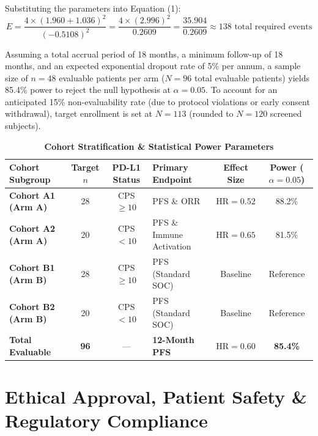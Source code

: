 \documentclass[10pt,a4paper]{article}
\begin{document}
Substituting the parameters into Equation (1):
\begin{equation}
  E = \frac{4 \times (1.960 + 1.036)^2}{(-0.5108)^2} = \frac{4 \times (2.996)^2}{0.2609} = \frac{35.904}{0.2609} \approx 138 \text{ total required events}
\end{equation}

Assuming a total accrual period of 18 months, a minimum follow-up of 18 months, and an expected exponential dropout rate of 5\% per annum, a sample size of $n = 48$ evaluable patients per arm ($N = 96$ total evaluable patients) yields 85.4\% power to reject the null hypothesis at $\alpha = 0.05$. To account for an anticipated 15\% non-evaluability rate (due to protocol violations or early consent withdrawal), target enrollment is set at $N = 113$ (rounded to $N = 120$ screened subjects).

\begin{table}[htbp]
\caption{\textbf{Cohort Stratification \& Statistical Power Parameters}}
\vspace{-0.4em}
\small
\begin{tabularx}{\textwidth}{l c c X c c}
\toprule
\rowcolor{HeaderBg} \textbf{Cohort Subgroup} & \textbf{Target $n$} & \textbf{PD-L1 Status} & \textbf{Primary Endpoint} & \textbf{Effect Size} & \textbf{Power ($\alpha=0.05$)} \\
\midrule
\textbf{Cohort A1 (Arm A)} & 28 & CPS $\ge 10$ & PFS \& ORR & $\text{HR} = 0.52$ & 88.2\% \\
\textbf{Cohort A2 (Arm A)} & 20 & CPS $< 10$ & PFS \& Immune Activation & $\text{HR} = 0.65$ & 81.5\% \\
\textbf{Cohort B1 (Arm B)} & 28 & CPS $\ge 10$ & PFS (Standard SOC) & Baseline & Reference \\
\textbf{Cohort B2 (Arm B)} & 20 & CPS $< 10$ & PFS (Standard SOC) & Baseline & Reference \\
\midrule
\textbf{Total Evaluable} & \textbf{96} & --- & \textbf{12-Month PFS} & \textbf{$\text{HR} = 0.60$} & \textbf{85.4\%} \\
\bottomrule
\end{tabularx}
\end{table}

\section{Ethical Approval, Patient Safety \& Regulatory Compliance}
\end{document}
